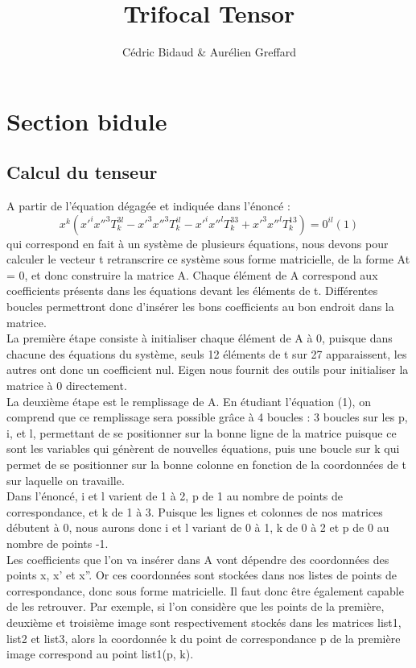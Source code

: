 \documentclass[a4paper,10pt]{report}
\title{Trifocal Tensor}
\author{Cédric Bidaud & Aurélien Greffard}
\begin{document}
\section{Section bidule}
\subsection{Calcul du tenseur}


A partir de l’équation dégagée et indiquée dans l’énoncé :
\[x^{k}(x'^{i}x''^{3}T^{3l}_{k} - x'^{3}x''^{3}T^{il}_{k} - x'^{i}x''^{l}T^{33}_{k} + x'^{3}x''^{l}T^{13}_{k}) = 0^{il} (1)\]
qui correspond en fait à un système de plusieurs équations, nous devons pour calculer le vecteur t retranscrire ce système sous forme matricielle, de la forme At = 0, et donc construire la matrice A. Chaque élément de A correspond aux coefficients présents dans les équations devant les éléments de t. Différentes boucles permettront donc d’insérer les bons coefficients au bon endroit dans la matrice.
\\

La première étape consiste à initialiser chaque élément de A à 0, puisque dans chacune des équations du système, seuls 12 éléments de t sur 27 apparaissent, les autres ont donc un coefficient nul. Eigen nous fournit des outils pour initialiser la matrice à 0 directement.
\\

La deuxième étape est le remplissage de A. En étudiant l’équation (1), on comprend que ce remplissage sera possible grâce à 4 boucles : 3 boucles sur les p, i, et l, permettant de se positionner sur la bonne ligne de la matrice puisque ce sont les variables qui génèrent de nouvelles équations, puis une boucle sur k qui permet de se positionner sur la bonne colonne en fonction de la coordonnées de t sur laquelle on travaille.
\\

Dans l’énoncé, i et l varient de 1 à 2, p de 1 au nombre de points de correspondance, et k de 1 à 3. Puisque les lignes et colonnes de nos matrices débutent à 0, nous aurons donc i et l variant de 0 à 1, k de 0 à 2 et p de 0 au nombre de points -1.
\\

Les coefficients que l’on va insérer dans A vont dépendre des coordonnées des points x, x’ et x”. Or ces coordonnées sont stockées dans nos listes de points de correspondance, donc sous forme matricielle. Il faut donc être également capable de les retrouver. Par exemple, si l’on considère que les points de la première, deuxième et troisième image sont respectivement stockés dans les matrices list1, list2 et list3, alors la coordonnée k du point de correspondance p de la première image correspond au point list1(p, k).
\\
\end{document}
